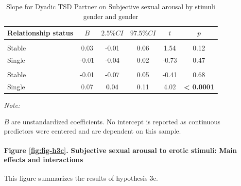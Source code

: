 \documentclass[
  bookmarksnumbered]{article}
\begin{document}
\begin{table}[H]
\centering
\caption{\label{tab:unnamed-chunk-32}Slope for Dyadic TSD Partner on Subjective sexual arousal
               by stimuli gender and gender}
\centering
\begin{threeparttable}
\begin{tabular}[t]{lccccc}
\toprule
Relationship status & $B$ & $2.5\% CI$ & $97.5\% CI$ & $t$ & $p$\\
\midrule
\addlinespace[0.3em]
\multicolumn{6}{l}{\cellcolor{lightgray}{Gender: Women}}\\
\hspace{1em}Stable & 0.03 & -0.01 & 0.06 & 1.54 & 0.12\\
\hspace{1em}Single & -0.01 & -0.04 & 0.02 & -0.73 & 0.47\\
\addlinespace[0.3em]
\multicolumn{6}{l}{\cellcolor{lightgray}{Gender: Men}}\\
\hspace{1em}Stable & -0.01 & -0.07 & 0.05 & -0.41 & 0.68\\
\hspace{1em}Single & 0.07 & 0.04 & 0.11 & 4.02 & \textbf{< 0.0001}\\
\bottomrule
\end{tabular}
\begin{tablenotes}[para]
\item \textit{Note: } 
\item $B$ are unstandardized coefficients. No intercept is reported
               as continuous predictors were centered and are dependent on this sample.
\end{tablenotes}
\end{threeparttable}
\end{table}

\paragraph{Figure \ref{fig:fig-h3c}. Subjective sexual arousal to erotic stimuli: Main effects and interactions}\label{figure-reffigfig-h3c.-subjective-sexual-arousal-to-erotic-stimuli-main-effects-and-interactions}

This figure summarizes the results of hypothesis 3c.
\end{document}
